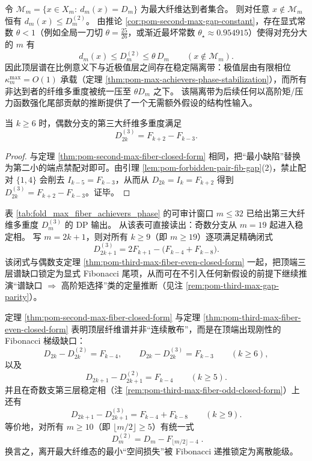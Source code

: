 \begin{remark}\label{rem:pom-maxfiber-isolation-band}
令 \(\mathcal{M}_m=\{x\in X_m:\ d_m(x)=D_m\}\) 为最大纤维达到者集合。
则对任意 \(x\notin\mathcal{M}_m\) 恒有 \(d_m(x)\le D_m^{(2)}\)。
由推论 \ref{cor:pom-second-max-gap-constant}，存在显式常数 \(\theta<1\)（例如全局一刀切 \(\theta=\tfrac{25}{26}\)，或渐近最坏常数 \(\theta_\star\approx 0.954915\)）使得对充分大的 \(m\) 有
\[
d_m(x)\le D_m^{(2)}\le \theta\,D_m\qquad(x\notin\mathcal{M}_m).
\]
因此顶层谱在比例意义下与近极值层之间存在稳定隔离带：极值层由有限相位 \(\kappa_m^{\mathrm{max}}=O(1)\) 承载（定理 \ref{thm:pom-max-achievers-phase-stabilization}），而所有非达到者的纤维多重度被统一压至 \(\theta D_m\) 之下。
该隔离带为后续任何以高阶矩/压力函数强化尾部贡献的推断提供了一个无需额外假设的结构性输入。
\end{remark}

\begin{theorem}[偶数支第三大纤维闭式]\label{thm:pom-third-max-fiber-even-closed-form}
当 \(k\ge 6\) 时，偶数分支的第三大纤维多重度满足
\[
D_{2k}^{(3)}=F_{k+2}-F_{k-3}.
\]
\end{theorem}
\begin{proof}
与定理 \ref{thm:pom-second-max-fiber-closed-form} 相同，把“最小缺陷”替换为第二小的端点禁配对即可。由引理 \ref{lem:pom-forbidden-pair-fib-gap}(2)，禁止配对 \(\{1,4\}\) 会削去 \(I_{k-5}=F_{k-3}\)，从而从 \(D_{2k}=I_k=F_{k+2}\) 得到 \(D_{2k}^{(3)}=F_{k+2}-F_{k-3}\)。证毕。
\end{proof}

\begin{remark}\label{rem:pom-third-max-fiber-odd-closed-form}
表 \ref{tab:fold_max_fiber_achievers_phase} 的可审计窗口 \(m\le 32\) 已给出第三大纤维多重度 \(D_m^{(3)}\) 的 DP 输出。
从该表可直接读出：奇数分支从 \(m=19\) 起进入稳定相。
写 \(m=2k+1\)，则对所有 \(k\ge 9\)（即 \(m\ge 19\)）逐项满足精确闭式
\[
\boxed{\;
D_{2k+1}^{(3)}=2F_{k+1}-\bigl(F_{k-4}+F_{k-8}\bigr).\;}
\]
该闭式与偶数支定理 \ref{thm:pom-third-max-fiber-even-closed-form} 一起，把顶端三层谱缺口锁定为显式 Fibonacci 尾项，从而可在不引入任何新假设的前提下继续推演“谱缺口 \(\Rightarrow\) 高阶矩选择”类的定量推断（见注 \ref{rem:pom-third-max-gap-parity}）。
\end{remark}

\begin{remark}\label{rem:pom-top-fiber-spectrum-ladder}
定理 \ref{thm:pom-second-max-fiber-closed-form} 与定理 \ref{thm:pom-third-max-fiber-even-closed-form} 表明顶层纤维谱并非“连续散布”，而是在顶端出现刚性的 Fibonacci 梯级缺口：
\[
D_{2k}-D_{2k}^{(2)}=F_{k-4},\qquad
D_{2k}-D_{2k}^{(3)}=F_{k-3}\qquad(k\ge 6),
\]
以及
\[
D_{2k+1}-D_{2k+1}^{(2)}=F_{k-4}\qquad(k\ge 5).
\]
并且在奇数支第三层稳定相（注 \ref{rem:pom-third-max-fiber-odd-closed-form}）上还有
\[
D_{2k+1}-D_{2k+1}^{(3)}=F_{k-4}+F_{k-8}\qquad(k\ge 9).
\]
等价地，对所有 \(m\ge 10\)（即 \(\lfloor m/2\rfloor\ge 5\)）有统一式
\[
\boxed{\;
D_m^{(2)}=D_m-F_{\lfloor m/2\rfloor-4}\; }.
\]
换言之，离开最大纤维态的最小“空间损失”被 Fibonacci 递推锁定为离散能级。
\end{remark}

